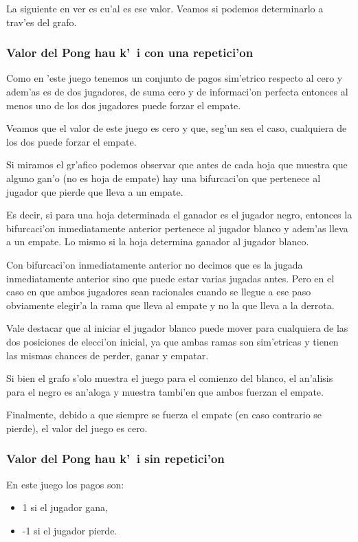 La siguiente en ver es cu'al es ese valor. Veamos si podemos determinarlo a trav'es del grafo.

\subsubsection{Valor del Pong hau k'\ i con una repetici'on}

Como en 'este juego tenemos un conjunto de pagos sim'etrico respecto al cero y adem'as es de dos jugadores, de suma cero y de informaci'on perfecta entonces al menos uno de los dos jugadores puede forzar el empate.

Veamos que el valor de este juego es cero y que, seg'un sea el caso, cualquiera de los dos puede forzar el empate.

Si miramos el gr'afico podemos observar que antes de cada hoja que muestra que alguno gan'o (no es hoja de empate) hay una bifurcaci'on que pertenece al jugador que pierde que lleva a un empate.

Es decir, si para una hoja determinada el ganador es el jugador negro, entonces la bifurcaci'on inmediatamente anterior pertenece al jugador blanco y adem'as lleva a un empate. Lo mismo si la hoja determina ganador al jugador blanco.

Con bifurcaci'on inmediatamente anterior no decimos que es la jugada inmediatamente anterior sino que puede estar varias jugadas antes. Pero en el caso en que ambos jugadores sean racionales cuando se llegue a ese paso obviamente elegir'a la rama que lleva al empate y no la que lleva a la derrota.

Vale destacar que al iniciar el jugador blanco puede mover para cualquiera de las dos posiciones de elecci'on inicial, ya que ambas ramas son sim'etricas y tienen las mismas chances de perder, ganar y empatar.

Si bien el grafo s'olo muestra el juego para el comienzo del blanco, el an'alisis para el negro es an'aloga y muestra tambi'en que ambos fuerzan el empate.

Finalmente, debido a que siempre se fuerza el empate (en caso contrario se pierde), el valor del juego es cero.

\subsubsection{Valor del Pong hau k'\ i sin repetici'on}

En este juego los pagos son:
\begin{itemize}
\item 1 si el jugador gana,
\item -1 si el jugador pierde.
\end{itemize}

